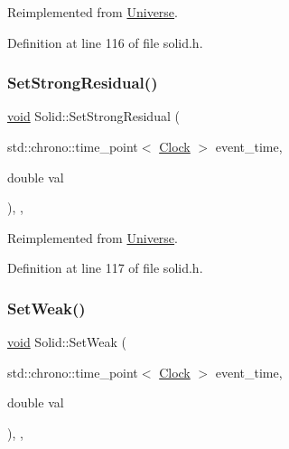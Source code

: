 Reimplemented from \mbox{\hyperlink{class_universe_aafec97a231126b71c73ac1258609a284}{Universe}}.



Definition at line 116 of file solid.\+h.

\mbox{\label{class_solid_a8b80ebe209fcd3afa4791968127753d0}} 
\subsubsection{\texorpdfstring{Set\+Strong\+Residual()}{SetStrongResidual()}}
{\footnotesize\ttfamily \mbox{\hyperlink{glad_8h_a950fc91edb4504f62f1c577bf4727c29}{void}} Solid\+::\+Set\+Strong\+Residual (\begin{DoxyParamCaption}\item[{std\+::chrono\+::time\+\_\+point$<$ \mbox{\hyperlink{universe_8h_a0ef8d951d1ca5ab3cfaf7ab4c7a6fd80}{Clock}} $>$}]{event\+\_\+time,  }\item[{double}]{val }\end{DoxyParamCaption})\hspace{0.3cm}{\ttfamily [inline]}, {\ttfamily [final]}, {\ttfamily [virtual]}}



Reimplemented from \mbox{\hyperlink{class_universe_a1b2d6197ddf3d613cc30bd04d22ed8b7}{Universe}}.



Definition at line 117 of file solid.\+h.

\mbox{\label{class_solid_aa28e0f7e4de2fc0c1e28d385214296bf}} 
\subsubsection{\texorpdfstring{Set\+Weak()}{SetWeak()}}
{\footnotesize\ttfamily \mbox{\hyperlink{glad_8h_a950fc91edb4504f62f1c577bf4727c29}{void}} Solid\+::\+Set\+Weak (\begin{DoxyParamCaption}\item[{std\+::chrono\+::time\+\_\+point$<$ \mbox{\hyperlink{universe_8h_a0ef8d951d1ca5ab3cfaf7ab4c7a6fd80}{Clock}} $>$}]{event\+\_\+time,  }\item[{double}]{val }\end{DoxyParamCaption})\hspace{0.3cm}{\ttfamily [inline]}, {\ttfamily [final]}, {\ttfamily [virtual]}}



